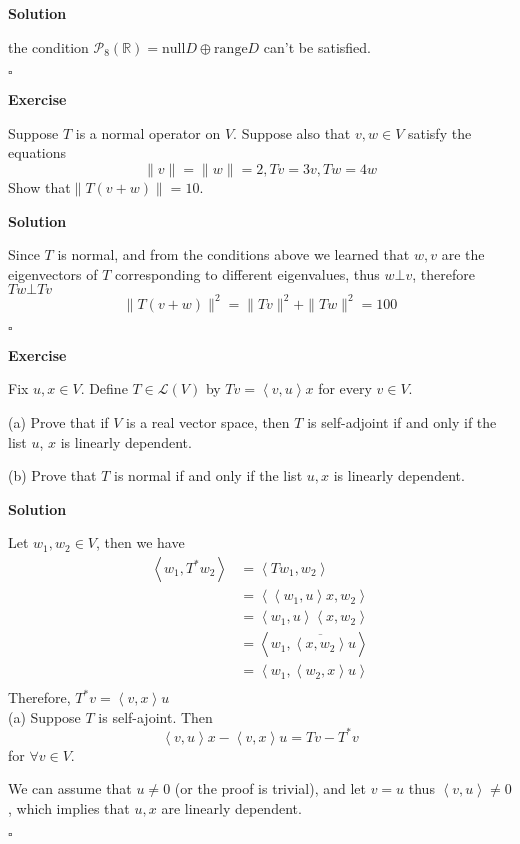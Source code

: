 \documentclass{article}
\newenvironment{exercise}{%
{\textbf{Exercise\\}
    }
}{
}
\newenvironment{solution}{%
{
    \textbf{Solution\\}
    }
}{
  \hfill $\square$ 
  \par\bigskip 
}
\newcommand{\RR}{\mathbb{R}}
\newcommand{\range}{\text{range}}
\newcommand{\n}{\text{null}}
\begin{document}
\begin{CJK}{UTF8}{gkai}
\begin{solution}
    the condition $\mathcal{P}_8(\RR) = \n D \oplus \range D$ can't be satisfied.
\end{solution}

\begin{exercise}
    Suppose $T$ is a normal operator on $V$. Suppose also that $v,w \in  V$ satisfy the
    equations
    \[\|v\| = \|w\| = 2, Tv =3v, Tw=4w\]
    Show that$\|T(v + w)\| = 10$.   
\end{exercise}

\begin{solution}
    Since $T$ is normal, and from the conditions above we learned that $w,v$ are the eigenvectors of $T$ corresponding to different eigenvalues, thus $w \bot v$, therefore $T w \bot T v$
    \[\|T(v + w)\|^2 = \|Tv\|^2 + \|Tw\|^2 = 100 \]
\end{solution}

\begin{exercise}
    Fix $u,x \in  V$. Define $T \in \mathcal{L}(V)$ by $Tv = \left<v,u\right>x$ for every $v \in  V$.
    
    (a) Prove that if $V$ is a real vector space, then $T$ is self-adjoint if and only if the list $u$, $x$ is linearly dependent.

    (b) Prove that $T$ is normal if and only if the list $u,x$ is linearly dependent.
\end{exercise}

\begin{solution}
    Let $w_1, w_2 \in V$, then we have
    \[
    \begin{aligned}
        \left<w_1,T^\ast w_2\right> &= \left<Tw_1, w_2\right>\\
        &= \left<\left<w_1,u\right> x, w_2\right>\\
        &= \left<w_1,u\right>\left< x, w_2\right>\\
        &= \left<w_1,\overline{\left< x, w_2\right>}u\right>\\
        &= \left<w_1,\left<w_2,x\right>u\right>\\
    \end{aligned}    
    \]
    Therefore, $T^\ast v = \left<v,x\right>u$\\

    (a) Suppose $T$ is self-ajoint. Then 
    \[\left<v,u\right>x - \left<v,x\right>u = Tv - T^\ast v\]
    for $\forall v \in V$.

    We can assume that $u \neq 0$ (or the proof is trivial), and let $v = u$ thus $\left<v,u\right> \neq 0$, which implies that $u,x$ are linearly dependent.


\end{solution}
\end{CJK}
\end{document}
